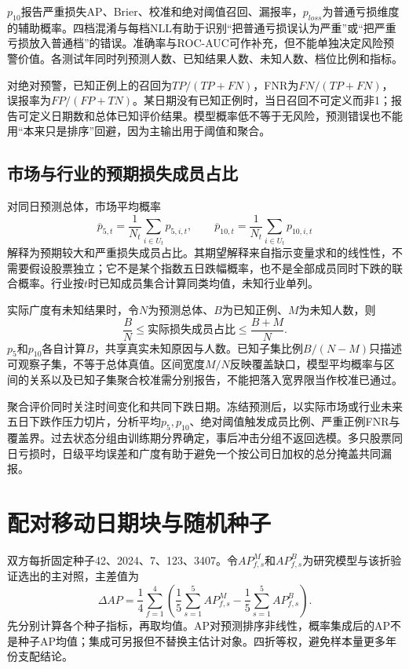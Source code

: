 $p_{10}$报告严重损失AP、Brier、校准和绝对阈值召回、漏报率，$p_{loss}$为普通亏损维度的辅助概率。四档混淆与每档NLL有助于识别“把普通亏损误认为严重”或“把严重亏损放入普通档”的错误。准确率与ROC-AUC可作补充，但不能单独决定风险预警价值。各测试年同时列预测人数、已知结果人数、未知人数、档位比例和指标。

对绝对预警，已知正例上的召回为$TP/(TP+FN)$，FNR为$FN/(TP+FN)$，误报率为$FP/(FP+TN)$。某日期没有已知正例时，当日召回不可定义而非1；报告可定义日期数和总体已知评价结果。模型概率低不等于无风险，预测错误也不能用“本来只是排序”回避，因为主输出用于阈值和聚合。

\subsection{市场与行业的预期损失成员占比}
对同日预测总体，市场平均概率
\begin{equation}
 \overline p_{5,t}=\frac1{N_t}\sum_{i\in U_t}p_{5,i,t},\qquad
 \overline p_{10,t}=\frac1{N_t}\sum_{i\in U_t}p_{10,i,t}
\end{equation}
解释为预期较大和严重损失成员占比。其期望解释来自指示变量求和的线性性，不需要假设股票独立；它不是某个指数五日跌幅概率，也不是全部成员同时下跌的联合概率。行业按$t$时已知成员集合计算同类均值，未知行业单列。

实际广度有未知结果时，令$N$为预测总体、$B$为已知正例、$M$为未知人数，则
\begin{equation}
 \frac BN\le\text{实际损失成员占比}\le\frac{B+M}{N}.
 \label{eq:breadthbounds}
\end{equation}
$p_5$和$p_{10}$各自计算$B$，共享真实未知原因与人数。已知子集比例$B/(N-M)$只描述可观察子集，不等于总体真值。区间宽度$M/N$反映覆盖缺口，模型平均概率与区间的关系以及已知子集聚合校准需分别报告，不能把落入宽界限当作校准已通过。


聚合评价同时关注时间变化和共同下跌日期。冻结预测后，以实际市场或行业未来五日下跌作压力切片，分析平均$p_5,p_{10}$、绝对阈值触发成员比例、严重正例FNR与覆盖界。过去状态分组由训练期分界确定，事后冲击分组不返回选模。多只股票同日亏损时，日级平均误差和广度有助于避免一个按公司日加权的总分掩盖共同漏报。

\section{配对移动日期块与随机种子}
双方每折固定种子42、2024、7、123、3407。令$AP_{f,s}^M$和$AP_{f,s}^B$为研究模型与该折验证选出的主对照，主差值为
\begin{equation}
 \Delta AP=\frac14\sum_{f=1}^{4}\left(\frac15\sum_{s=1}^{5}AP_{f,s}^M-
 \frac15\sum_{s=1}^{5}AP_{f,s}^B\right).
\end{equation}
先分别计算各个种子指标，再取均值。AP对预测排序非线性，概率集成后的AP不是种子AP均值；集成可另报但不替换主估计对象。四折等权，避免样本量更多年份支配结论。

